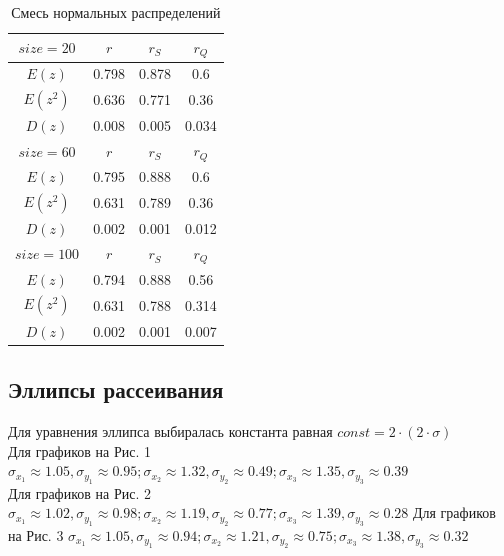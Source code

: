 \documentclass[a4paper]{article}
\begin{document}
	
	\begin{table}[H]
		\centering
		\begin{tabular}{| c | c | c | c |}
			
			\hline
			$size = 20$ & $r$      & $r_{S}$ & $r_{Q}$ \\
			\hline
			$E(z)$      & 0.798 & 0.878 & 0.6   \\
                $E(z^{2}) $    & 0.636 & 0.771 & 0.36  \\
                $D(z)$      & 0.008 & 0.005 & 0.034 \\
			\hline
			$size = 60$ & $r$      & $r_{S}$ & $r_{Q}$ \\
			\hline
			$E(z)$      & 0.795 & 0.888 & 0.6   \\
                $E(z^{2}) $    & 0.631 & 0.789 & 0.36  \\
                $D(z)$      & 0.002 & 0.001 & 0.012 \\
			\hline
			$size = 100$ & $r$      & $r_{S}$ & $r_{Q}$ \\
			\hline
			$E(z)$       & 0.794 & 0.888 & 0.56  \\
                 $E(z^{2}) $     & 0.631 & 0.788 & 0.314 \\
                 $D(z)$       & 0.002 & 0.001 & 0.007 \\
			\hline
			
		\end{tabular}{}
		\caption{Смесь нормальных распределений}
		\label{tab:mix_normal}
	\end{table}
\subsection{Эллипсы рассеивания}
\noindent Для уравнения эллипса выбиралась константа равная $const = 2 \cdot (2 \cdot \sigma)$\\
Для графиков на Рис. 1 $\sigma_{x_1} \approx 1.05, \sigma_{y_1} \approx 0.95; \sigma_{x_2} \approx 1.32, \sigma_{y_2} \approx 0.49; \sigma_{x_3} \approx 1.35, \sigma_{y_3} \approx 0.39 $\\
Для графиков на Рис. 2 $\sigma_{x_1} \approx 1.02, \sigma_{y_1} \approx 0.98; \sigma_{x_2} \approx 1.19, \sigma_{y_2} \approx 0.77; \sigma_{x_3} \approx 1.39, \sigma_{y_3} \approx 0.28 $
Для графиков на Рис. 3 $\sigma_{x_1} \approx 1.05, \sigma_{y_1} \approx 0.94; \sigma_{x_2} \approx 1.21, \sigma_{y_2} \approx 0.75; \sigma_{x_3} \approx 1.38, \sigma_{y_3} \approx 0.32 $
\end{document}
